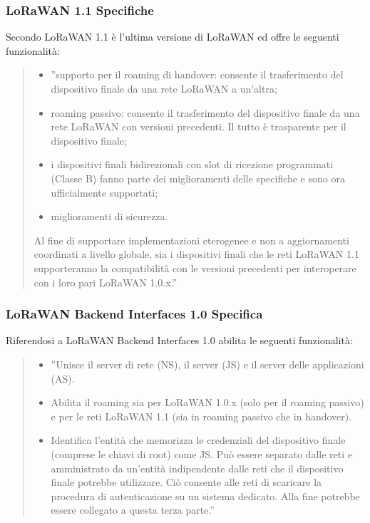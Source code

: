 \documentclass[a4paper]{report} %
\begin{document}
\subsubsection{LoRaWAN 1.1 Specifiche}
Secondo \cite{art:rif.29} LoRaWAN 1.1 è l'ultima versione di LoRaWAN ed offre le seguenti funzionalità:
\begin{quote}
	\begin{itemize}
		\item ''supporto per il roaming di handover: consente il trasferimento del dispositivo finale da una rete LoRaWAN a un'altra; 
		\item roaming passivo: consente il trasferimento del dispositivo finale da una rete LoRaWAN con versioni precedenti. Il tutto è trasparente per il dispositivo finale;
		\item i dispositivi finali bidirezionali con slot di ricezione programmati (Classe B) fanno parte dei miglioramenti delle specifiche e sono ora ufficialmente supportati;
		\item miglioramenti di sicurezza.
	\end{itemize}
	Al fine di supportare implementazioni eterogenee e non a aggiornamenti coordinati a livello globale, sia i dispositivi finali che le reti LoRaWAN 1.1 supporteranno la compatibilità con le versioni precedenti per interoperare con i loro pari LoRaWAN 1.0.x.''
\end{quote}

\subsubsection{LoRaWAN Backend Interfaces 1.0 Specifica}
Riferendosi a \cite{art:rif.29} LoRaWAN Backend Interfaces 1.0 abilita le seguenti funzionalità:
\begin{quote}
	\begin{itemize}
	\item ''Unisce il server di rete (NS), il server (JS) e il server delle applicazioni (AS).
	\item Abilita il roaming sia per LoRaWAN 1.0.x (solo per il roaming passivo) e per le reti LoRaWAN 1.1 (sia in roaming passivo che in handover).
	\item Identifica l'entità che memorizza le credenziali del dispositivo finale (comprese le chiavi di root) come JS. Può essere separato dalle reti e amministrato da un'entità indipendente dalle reti che il dispositivo finale potrebbe utilizzare. Ciò consente alle reti di scaricare la procedura di autenticazione su un sistema dedicato. Alla fine potrebbe essere collegato a questa terza parte.''
	\end{itemize}
\end{quote}
\end{document}
